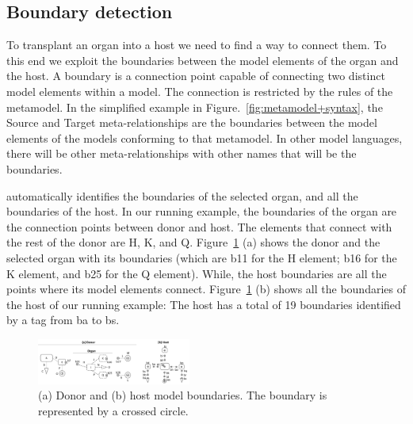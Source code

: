 
\subsection{Boundary detection}
To transplant an organ into a host we need to find a way to connect them. To this end we exploit the boundaries between the model elements of the organ and the host. A boundary is a connection point capable of connecting two distinct model elements within a model. The connection is restricted by the rules of the metamodel. In the simplified example in Figure.~\ref{fig:metamodel+syntax}, the Source and Target meta-relationships are the boundaries between the model elements of the models conforming to that metamodel. In other model languages, there will be other meta-relationships with other names that will be the boundaries.

\ApproachName{} automatically identifies the boundaries of the selected organ, and all the boundaries of the host. In our running example, the boundaries of the organ are the connection points between donor and host. The elements that connect with the rest of the donor are H, K, and Q. Figure~\ref{fig:org_bound} (a) shows the donor and the selected organ with its boundaries (which are b11 for the H element; b16 for the K element, and b25 for the Q element). While, the host boundaries are all the points where its model elements connect. Figure~\ref{fig:org_bound} (b) shows all the boundaries of the host of our running example: The host has a total of 19 boundaries identified by a tag from ba to bs.

\begin{figure}[tb]
    \centering
    \includegraphics[width=0.45\textwidth]{Figures/donor+host+boundaries.png}
    \caption{(a) Donor  and (b) host model boundaries. The boundary is represented by a crossed circle.}
    \label{fig:org_bound}
\end{figure}


